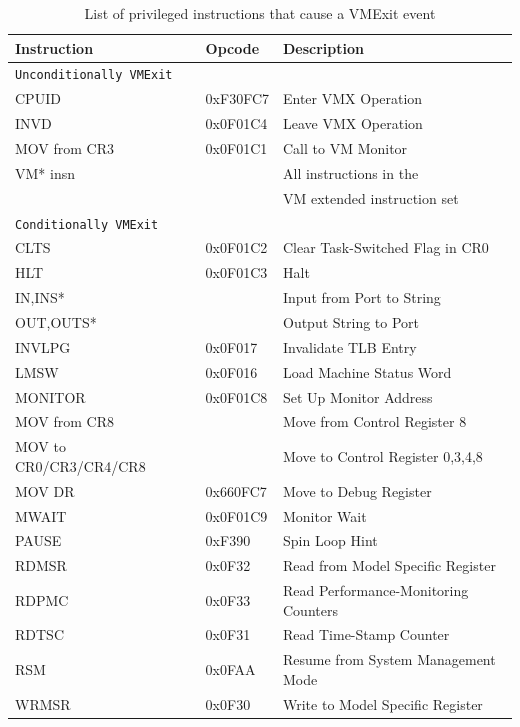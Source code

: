 \begin{table}[t]
\centering
\begin{tabular}{|l|l|l|}
\hline
\bf{Instruction} & \bf{Opcode}  & \bf{Description}  \\
\hline
\texttt{Unconditionally VMExit}  \\
\hline
CPUID          & 0xF30FC7 & Enter VMX Operation \\
INVD           & 0x0F01C4 & Leave VMX Operation \\
MOV from CR3   & 0x0F01C1 & Call to VM Monitor \\
VM* insn & & All instructions in the \\
& & VM extended instruction set \\
\hline
\texttt{Conditionally VMExit}  \\
\hline
CLTS          & 0x0F01C2 & Clear Task-Switched Flag in CR0 \\
HLT           & 0x0F01C3 & Halt \\
IN,INS*       &          & Input from Port to String \\
OUT,OUTS*     &          & Output String to Port \\
INVLPG        & 0x0F017  & Invalidate TLB Entry \\
LMSW          & 0x0F016  & Load Machine Status Word \\
MONITOR       & 0x0F01C8 & Set Up Monitor Address \\
MOV from CR8  &          & Move from Control Register 8 \\
MOV to CR0/CR3/CR4/CR8  && Move to Control Register 0,3,4,8 \\
MOV DR  & 0x660FC7   & Move to Debug Register \\
MWAIT   & 0x0F01C9   & Monitor Wait  \\
PAUSE   & 0xF390     & Spin Loop Hint \\
RDMSR   & 0x0F32     & Read from Model Specific Register \\
RDPMC   & 0x0F33     & Read Performance-Monitoring Counters \\
RDTSC   & 0x0F31     & Read Time-Stamp Counter \\
RSM     & 0x0FAA     & Resume from System Management Mode \\
WRMSR   & 0x0F30     & Write to Model Specific Register \\
\hline
\end{tabular}
\caption{List of privileged instructions that cause a VMExit event}
\label{virt:insntrap}
\end{table}

